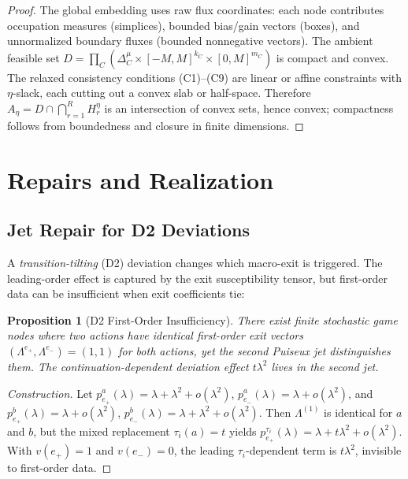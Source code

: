 \documentclass[12pt,a4paper]{article}
\newtheorem{proposition}[theorem]{Proposition}
\theoremstyle{definition}
\begin{document}
\begin{proof}
The global embedding uses raw flux coordinates: each node contributes occupation measures (simplices), bounded bias/gain vectors (boxes), and unnormalized boundary fluxes (bounded nonnegative vectors). The ambient feasible set $D = \prod_C (\Delta_C^\mu \times [-M, M]^{k_C} \times [0, M]^{m_C})$ is compact and convex. The relaxed consistency conditions (C1)--(C9) are linear or affine constraints with $\eta$-slack, each cutting out a convex slab or half-space. Therefore $A_\eta = D \cap \bigcap_{r=1}^R H_r^\eta$ is an intersection of convex sets, hence convex; compactness follows from boundedness and closure in finite dimensions.
\end{proof}

\section{Repairs and Realization}
\label{sec:repairs}

\subsection{Jet Repair for D2 Deviations}
\label{sec:jet-repair}

A \emph{transition-tilting} (D2) deviation changes which macro-exit is triggered. The leading-order effect is captured by the exit susceptibility tensor, but first-order data can be insufficient when exit coefficients tie:

\begin{proposition}[D2 First-Order Insufficiency]
\label{prop:d2-tie}
There exist finite stochastic game nodes where two actions have identical first-order exit vectors $(\Lambda^{e_+}, \Lambda^{e_-}) = (1, 1)$ for both actions, yet the second Puiseux jet distinguishes them. The continuation-dependent deviation effect $t \lambda^2$ lives in the second jet.
\end{proposition}

\begin{proof}[Construction]
Let $p^a_{e_+}(\lambda) = \lambda + \lambda^2 + o(\lambda^2)$, $p^a_{e_-}(\lambda) = \lambda + o(\lambda^2)$, and $p^b_{e_+}(\lambda) = \lambda + o(\lambda^2)$, $p^b_{e_-}(\lambda) = \lambda + \lambda^2 + o(\lambda^2)$. Then $\Lambda^{(1)}$ is identical for $a$ and $b$, but the mixed replacement $\tau_i(a) = t$ yields $p^{\tau_i}_{e_+}(\lambda) = \lambda + t\lambda^2 + o(\lambda^2)$. With $v(e_+) = 1$ and $v(e_-) = 0$, the leading $\tau_i$-dependent term is $t\lambda^2$, invisible to first-order data.
\end{proof}
\end{document}
